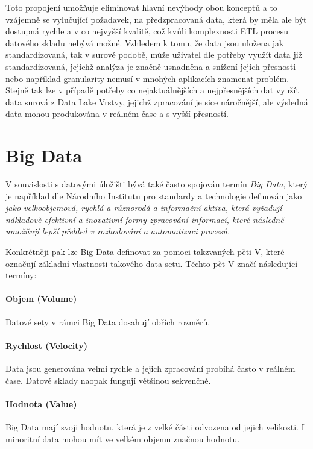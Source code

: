 \documentclass[
  digital,     %
  twoside,     %
  lof,         %
  lot,         %
]{fithesis4}
\begin{document}
Toto propojení umožňuje eliminovat hlavní nevýhody obou konceptů a to vzájemně se vylučující požadavek, na předzpracovaná data, která by měla ale být dostupná rychle a v co nejvyšší kvalitě, což kvůli komplexnosti ETL procesu datového skladu nebývá možné. Vzhledem k tomu, že data jsou uložena jak standardizovaná, tak v surové podobě, může uživatel dle potřeby využít data již standardizovaná, jejichž analýza je značně usnadněna a snížení jejich přesnosti nebo například granularity nemusí v mnohých aplikacích znamenat problém. Stejně tak lze v případě potřeby co nejaktuálnějších  a nejpřesnějších dat využít data surová z Data Lake Vrstvy, jejichž zpracování je sice náročnější, ale výsledná data mohou produkována v reálném čase a s vyšší přesností.\parencite[s.~3]{Harby20221217} 


\section{Big Data}
V souvislosti s datovými úložišti bývá také často spojován termín \emph{Big Data}, který je například dle Národního Institutu pro standardy a technologie definován jako \emph{jako velkoobjemová, rychlá a různorodá a informační aktiva, která vyžadují nákladově efektivní a inovativní formy zpracování informací, které následně umožňují lepší přehled v rozhodování a automatizaci procesů.  } \parencite{Gartner} 

Konkrétněji pak lze Big Data definovat za pomoci takzvaných pěti V, které označují základní vlastnosti takového data setu.  Těchto pět V značí následující termíny: \parencite{big_data}
\paragraph{Objem (Volume) }
Datové sety v rámci Big Data dosahují obřích rozměrů.

\paragraph{Rychlost (Velocity)}
Data jsou generována velmi rychle a jejich zpracování probíhá často v reálném čase. Datové sklady naopak fungují většinou sekvenčně.

\paragraph{Hodnota (Value)}
Big Data mají svoji hodnotu, která je z velké části odvozena od jejich velikosti. I minoritní data mohou mít ve velkém objemu značnou hodnotu. 
\end{document}
